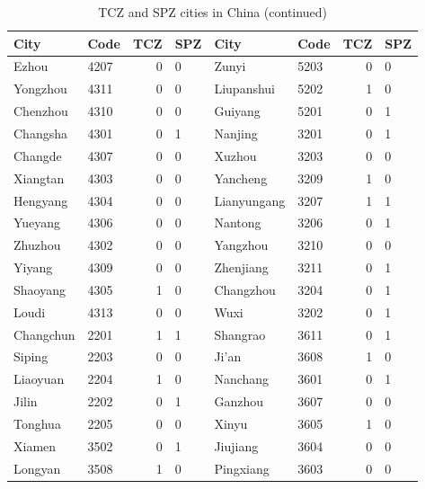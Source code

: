 \documentclass[12pt]{article}
\begin{document}
\begin{table}[!htb] \centering
  \caption{TCZ and SPZ cities in China (continued)}
  \begin{adjustbox}{width=\textwidth, totalheight=\baselineskip,keepaspectratio}
    \label{tab:appendix2}
\begin{tabular}{llrlllrl}
\hline
          City &  Code &  TCZ & SPZ &         City &  Code &  TCZ & SPZ \\
\midrule
         Ezhou &  4207 &    0 &   0 &        Zunyi &  5203 &    0 &   0 \\
      Yongzhou &  4311 &    0 &   0 &   Liupanshui &  5202 &    1 &   0 \\
      Chenzhou &  4310 &    0 &   0 &      Guiyang &  5201 &    0 &   1 \\
      Changsha &  4301 &    0 &   1 &      Nanjing &  3201 &    0 &   1 \\
       Changde &  4307 &    0 &   0 &       Xuzhou &  3203 &    0 &   0 \\
      Xiangtan &  4303 &    0 &   0 &     Yancheng &  3209 &    1 &   0 \\
      Hengyang &  4304 &    0 &   0 &  Lianyungang &  3207 &    1 &   1 \\
       Yueyang &  4306 &    0 &   0 &      Nantong &  3206 &    0 &   1 \\
       Zhuzhou &  4302 &    0 &   0 &     Yangzhou &  3210 &    0 &   0 \\
        Yiyang &  4309 &    0 &   0 &    Zhenjiang &  3211 &    0 &   1 \\
      Shaoyang &  4305 &    1 &   0 &    Changzhou &  3204 &    0 &   1 \\
         Loudi &  4313 &    0 &   0 &         Wuxi &  3202 &    0 &   1 \\
     Changchun &  2201 &    1 &   1 &     Shangrao &  3611 &    0 &   1 \\
        Siping &  2203 &    0 &   0 &        Ji'an &  3608 &    1 &   0 \\
      Liaoyuan &  2204 &    1 &   0 &     Nanchang &  3601 &    0 &   1 \\
         Jilin &  2202 &    0 &   1 &      Ganzhou &  3607 &    0 &   0 \\
       Tonghua &  2205 &    0 &   0 &        Xinyu &  3605 &    1 &   0 \\
        Xiamen &  3502 &    0 &   1 &     Jiujiang &  3604 &    0 &   0 \\
       Longyan &  3508 &    1 &   0 &    Pingxiang &  3603 &    0 &   0 \\

\end{tabular}
\end{adjustbox}
\end{table}
\end{document}
